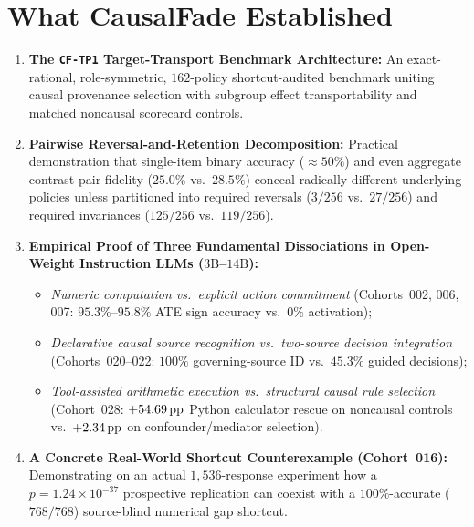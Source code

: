 \section{What CausalFade Established}
\begin{enumerate}
  \item \textbf{The \texttt{CF-TP1} Target-Transport Benchmark Architecture:} An exact-rational, role-symmetric, $162$-policy shortcut-audited benchmark uniting causal provenance selection with subgroup effect transportability and matched noncausal scorecard controls.
  \item \textbf{Pairwise Reversal-and-Retention Decomposition:} Practical demonstration that single-item binary accuracy ($\approx 50\%$) and even aggregate contrast-pair fidelity ($25.0\%$ vs.\ $28.5\%$) conceal radically different underlying policies unless partitioned into required reversals ($3/256$ vs.\ $27/256$) and required invariances ($125/256$ vs.\ $119/256$).
  \item \textbf{Empirical Proof of Three Fundamental Dissociations in Open-Weight Instruction LLMs ($3\text{B}$--$14\text{B}$):}
    \begin{itemize}
      \item \emph{Numeric computation vs.\ explicit action commitment} (Cohorts~002, 006, 007: $95.3\%$--$95.8\%$ ATE sign accuracy vs.\ $0\%$ activation);
      \item \emph{Declarative causal source recognition vs.\ two-source decision integration} (Cohorts~020--022: $100\%$ governing-source ID vs.\ $45.3\%$ guided decisions);
      \item \emph{Tool-assisted arithmetic execution vs.\ structural causal rule selection} (Cohort~028: $+54.69\,\mathrm{pp}$ Python calculator rescue on noncausal controls vs.\ $+2.34\,\mathrm{pp}$ on confounder/mediator selection).
    \end{itemize}
  \item \textbf{A Concrete Real-World Shortcut Counterexample (Cohort~016):} Demonstrating on an actual $1{,}536$-response experiment how a $p = 1.24\times 10^{-37}$ prospective replication can coexist with a $100\%$-accurate ($768/768$) source-blind numerical gap shortcut.
\end{enumerate}

